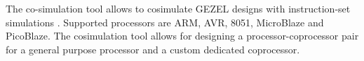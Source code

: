 The co-simulation tool allows to cosimulate GEZEL designs with
instruction-set simulations \cite{gezel}. Supported processors are
ARM, AVR, 8051, MicroBlaze and PicoBlaze. The cosimulation tool allows
for designing a processor-coprocessor pair for a general purpose
processor and a custom dedicated coprocessor.

